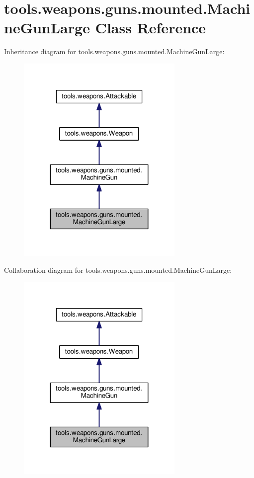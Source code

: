 \hypertarget{classtools_1_1weapons_1_1guns_1_1mounted_1_1_machine_gun_large}{}\section{tools.\+weapons.\+guns.\+mounted.\+Machine\+Gun\+Large Class Reference}
\label{classtools_1_1weapons_1_1guns_1_1mounted_1_1_machine_gun_large}


Inheritance diagram for tools.\+weapons.\+guns.\+mounted.\+Machine\+Gun\+Large\+:\nopagebreak
\begin{figure}[H]
\begin{center}
\leavevmode
\includegraphics[width=227pt]{classtools_1_1weapons_1_1guns_1_1mounted_1_1_machine_gun_large__inherit__graph}
\end{center}
\end{figure}


Collaboration diagram for tools.\+weapons.\+guns.\+mounted.\+Machine\+Gun\+Large\+:\nopagebreak
\begin{figure}[H]
\begin{center}
\leavevmode
\includegraphics[width=227pt]{classtools_1_1weapons_1_1guns_1_1mounted_1_1_machine_gun_large__coll__graph}
\end{center}
\end{figure}
